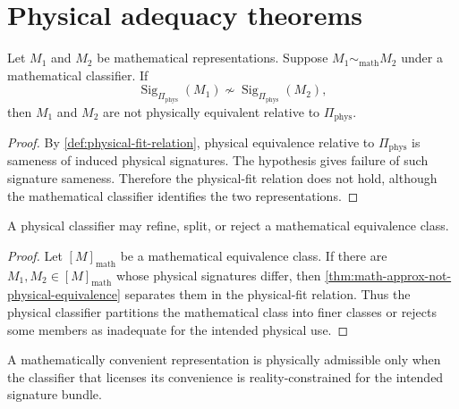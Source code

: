 \section{Physical adequacy theorems}
\label{sec:physical-adequacy-theorems}

\begin{theorem}
\label{thm:math-approx-not-physical-equivalence}
Let $M_1$ and $M_2$ be mathematical representations. Suppose $M_1\sim_{\mathrm{math}}M_2$ under a mathematical classifier. If
$$
\operatorname{Sig}_{\Pi_{\mathrm{phys}}}(M_1)
\not\sim
\operatorname{Sig}_{\Pi_{\mathrm{phys}}}(M_2),
$$
then $M_1$ and $M_2$ are not physically equivalent relative to $\Pi_{\mathrm{phys}}$.
\end{theorem}

\begin{proof}
By \autoref{def:physical-fit-relation}, physical equivalence relative to $\Pi_{\mathrm{phys}}$ is sameness of induced physical signatures. The hypothesis gives failure of such signature sameness. Therefore the physical-fit relation does not hold, although the mathematical classifier identifies the two representations.
\end{proof}

\begin{corollary}
\label{cor:physics-refines-mathematical-equivalence}
A physical classifier may refine, split, or reject a mathematical equivalence class.
\end{corollary}

\begin{proof}
Let $[M]_{\mathrm{math}}$ be a mathematical equivalence class. If there are $M_1,M_2\in[M]_{\mathrm{math}}$ whose physical signatures differ, then \autoref{thm:math-approx-not-physical-equivalence} separates them in the physical-fit relation. Thus the physical classifier partitions the mathematical class into finer classes or rejects some members as inadequate for the intended physical use.
\end{proof}

\begin{corollary}
\label{cor:mathematical-convenience-not-physical-certificate}
A mathematically convenient representation is physically admissible only when the classifier that licenses its convenience is reality-constrained for the intended signature bundle.
\end{corollary}


